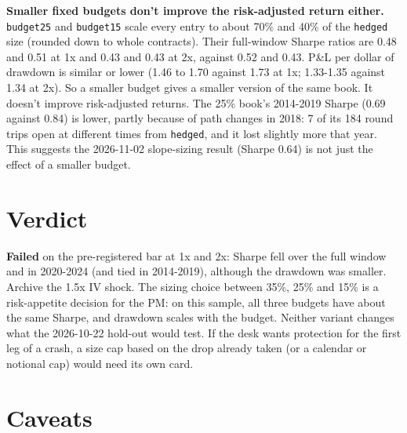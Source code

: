 \documentclass{article}
\begin{document}
\textbf{Smaller fixed budgets don't improve the risk-adjusted return either.} \texttt{budget25} and \texttt{budget15} scale every entry to about 70\% and 40\% of the \texttt{hedged} size (rounded down to whole contracts). Their full-window Sharpe ratios are 0.48 and 0.51 at 1x and 0.43 and 0.43 at 2x, against 0.52 and 0.43. P\&L per dollar of drawdown is similar or lower (1.46 to 1.70 against 1.73 at 1x; 1.33-1.35 against 1.34 at 2x). So a smaller budget gives a smaller version of the same book. It doesn't improve risk-adjusted returns. The 25\% book's 2014-2019 Sharpe (0.69 against 0.84) is lower, partly because of path changes in 2018: 7 of its 184 round trips open at different times from \texttt{hedged}, and it lost slightly more that year. This suggests the 2026-11-02 slope-sizing result (Sharpe 0.64) is not just the effect of a smaller budget.

\section{Verdict}

\textbf{Failed} on the pre-registered bar at 1x and 2x: Sharpe fell over the full window and in 2020-2024 (and tied in 2014-2019), although the drawdown was smaller. Archive the 1.5x IV shock. The sizing choice between 35\%, 25\% and 15\% is a risk-appetite decision for the PM: on this sample, all three budgets have about the same Sharpe, and drawdown scales with the budget. Neither variant changes what the 2026-10-22 hold-out would test. If the desk wants protection for the first leg of a crash, a size cap based on the drop already taken (or a calendar or notional cap) would need its own card.

\section{Caveats}
\end{document}
